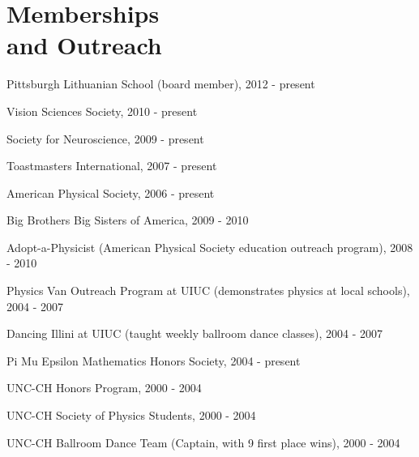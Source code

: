 \section{\sc Memberships\\and Outreach} %
\begin{list2}
\item[-] Pittsburgh Lithuanian School (board member), 2012 - present
\item[-] Vision Sciences Society, 2010 - present
\item[-] Society for Neuroscience, 2009 - present
\item[-] Toastmasters International, 2007 - present
\item[-] American Physical Society, 2006 - present
\item[-] Big Brothers Big Sisters of America, 2009 - 2010
\item[-] Adopt-a-Physicist (American Physical Society education outreach program), 2008 - 2010
\item[-] Physics Van Outreach Program at UIUC (demonstrates physics at local schools), 2004 - 2007
\item[-] Dancing Illini at UIUC (taught weekly ballroom dance classes), 2004 - 2007
\item[-] Pi Mu Epsilon Mathematics Honors Society, 2004 - present
\item[-] UNC-CH Honors Program, 2000 - 2004
\item[-] UNC-CH Society of Physics Students, 2000 - 2004
\item[-] UNC-CH Ballroom Dance Team (Captain, with 9 first place wins), 2000 - 2004
\end{list2}

